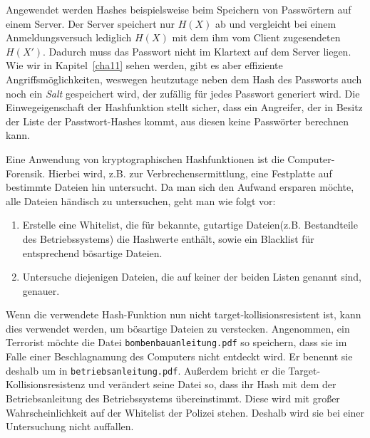 \begin{beispiel}\indexPreImageResistance
Angewendet werden Hashes beispielsweise beim Speichern von
Passwörtern auf einem Server. Der Server speichert nur $H(X)$ ab und
vergleicht bei einem Anmeldungsversuch lediglich $H(X)$ mit dem ihm vom
Client zugesendeten $H(X')$. Dadurch muss das Passwort nicht im Klartext
auf dem Server liegen. Wie wir in Kapitel~\ref{cha11} sehen werden, gibt
es aber effiziente Angriffsmöglichkeiten, weswegen heutzutage neben dem
Hash des Passworts auch noch ein \emph{Salt} gespeichert wird, der
zufällig für jedes Passwort generiert wird.
Die Einwegeigenschaft der Hashfunktion stellt sicher, dass ein
Angreifer, der in Besitz der Liste der Passtwort-Hashes kommt, aus
diesen keine Passwörter berechnen kann.
\end{beispiel}

\begin{beispiel}\indexTargetCollisionResistance
Eine Anwendung von kryptographischen Hashfunktionen ist die
Computer-Forensik. Hierbei wird, z.B. zur Verbrechensermittlung, eine
Festplatte auf bestimmte Dateien hin untersucht. Da man sich den Aufwand
ersparen möchte, alle Dateien händisch zu untersuchen, geht man wie
folgt vor:
\begin{enumerate}
  \item Erstelle eine Whitelist, die für bekannte, gutartige
    Dateien(z.B. Bestandteile des Betriebssystems) die Hashwerte
    enthält, sowie ein Blacklist für entsprechend bösartige Dateien.
  \item Untersuche diejenigen Dateien, die auf keiner der beiden Listen
    genannt sind, genauer.
\end{enumerate}

Wenn die verwendete Hash-Funktion nun nicht target-kollisionsresistent
ist, kann dies verwendet werden, um bösartige Dateien zu
verstecken. Angenommen, ein Terrorist möchte die Datei
\texttt{bombenbauanleitung.pdf} so speichern, dass sie im Falle einer
Beschlagnamung des Computers nicht entdeckt wird. Er benennt sie deshalb
um in \texttt{betriebsanleitung.pdf}. Außerdem bricht er die
Target-Kollisionsresistenz und verändert seine Datei so, dass ihr Hash
mit dem der Betriebsanleitung des Betriebssystems übereinstimmt. Diese
wird mit großer Wahrscheinlichkeit auf der Whitelist der Polizei
stehen. Deshalb wird sie bei einer Untersuchung nicht
auffallen\cite{Stevens2012}.
\end{beispiel}
